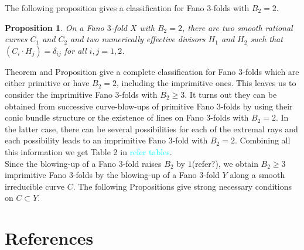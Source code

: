 \documentclass[12pt]{amsart}
\theoremstyle{plain}
\newtheorem{proposition}[theorem]{Proposition}
\theoremstyle{definition}
\theoremstyle{expl}
\begin{document}
        The following proposition gives a classification for Fano $3$-folds with $B_2 =2$. 
    \begin{proposition}
    	On a Fano $3$-fold $X$ with $B_2 =2$, there are two smooth rational curves $C_1$ and $C_2$ and two numerically effective divisors $H_1$ and $H_2$ such that $(C_i \cdot H_j)= \delta_{ij}$ for all $i,j=1,2$. 
    \end{proposition}
    \noindent Theorem and Proposition give a complete classification for Fano $3$-folds which are either primitive or have $B_2 =2$, including the imprimitive ones.  
    This leaves us to consider the imprimitive Fano $3$-folds with $B_2 \geq 3$. 
    It turns out they can be obtained from successive curve-blow-ups of primitive Fano $3$-folds by using their conic bundle structure or the existence of lines on Fano $3$-folds with $B_2=2$. In the latter case, there can be several possibilities for each of the extremal rays and each possibility leads to an imprimitive Fano $3$-fold with $B_2=2$. Combining all this information we get Table 2 in \textcolor{cyan}{refer tables}.\\
    \noindent Since the blowing-up of a Fano $3$-fold raises $B_2$ by $1$(refer?), we obtain $B_2 \geq 3$ imprimitive Fano $3$-folds by the blowing-up of a Fano $3$-fold $Y$ along a smooth irreducible curve $C$. The following Propositions give strong necessary conditions on $C \subset Y$.
    
	\section{References}
\end{document}
